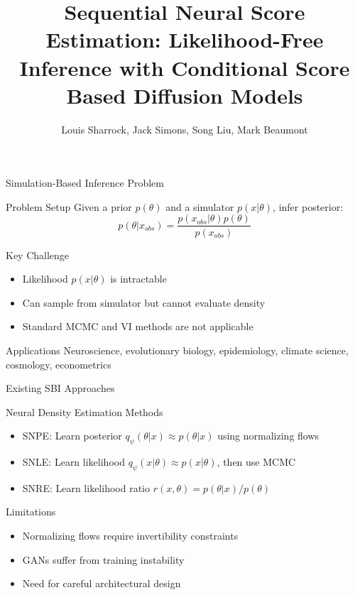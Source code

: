 \documentclass{beamer}
\title{Sequential Neural Score Estimation: Likelihood-Free Inference with Conditional Score Based Diffusion Models}
\author{Louis Sharrock, Jack Simons, Song Liu, Mark Beaumont}
\institute{Talk by Gleb Karpeev}
\date{}
\begin{document}
\begin{frame}
\titlepage
\end{frame}

\begin{frame}{Simulation-Based Inference Problem}

\begin{block}{Problem Setup}
Given a prior $p(\theta)$ and a simulator $p(x|\theta)$, infer posterior:
\begin{equation*}
p(\theta|x_{obs}) = \frac{p(x_{obs}|\theta)p(\theta)}{p(x_{obs})}
\end{equation*}
\end{block}

\begin{block}{Key Challenge}
\begin{itemize}
    \item Likelihood $p(x|\theta)$ is intractable
    \item Can sample from simulator but cannot evaluate density
    \item Standard MCMC and VI methods are not applicable
\end{itemize}
\end{block}

\begin{block}{Applications}
Neuroscience, evolutionary biology, epidemiology, climate science, cosmology, econometrics
\end{block}

\end{frame}

\begin{frame}{Existing SBI Approaches}

\begin{block}{Neural Density Estimation Methods}
\begin{itemize}
    \item SNPE: Learn posterior $q_\psi(\theta|x) \approx p(\theta|x)$ using normalizing flows
    \item SNLE: Learn likelihood $q_\psi(x|\theta) \approx p(x|\theta)$, then use MCMC
    \item SNRE: Learn likelihood ratio $r(x,\theta) = p(\theta|x)/p(\theta)$
\end{itemize}
\end{block}

\begin{block}{Limitations}
\begin{itemize}
    \item Normalizing flows require invertibility constraints
    \item GANs suffer from training instability
    \item Need for careful architectural design
\end{itemize}
\end{block}

\end{frame}
\end{document}
